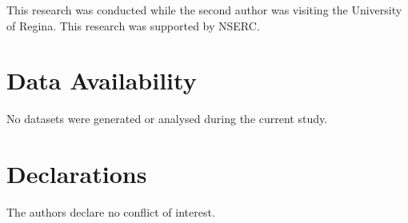 \documentclass{file}
\begin{document}
This research was conducted while the second author was visiting the University of Regina. 
This research was supported by NSERC.

\section*{Data Availability} No datasets were generated or analysed during the current study.
\section*{Declarations}
The authors declare no conflict of interest.




\nocite{*}
\newpage
    
\end{document}
